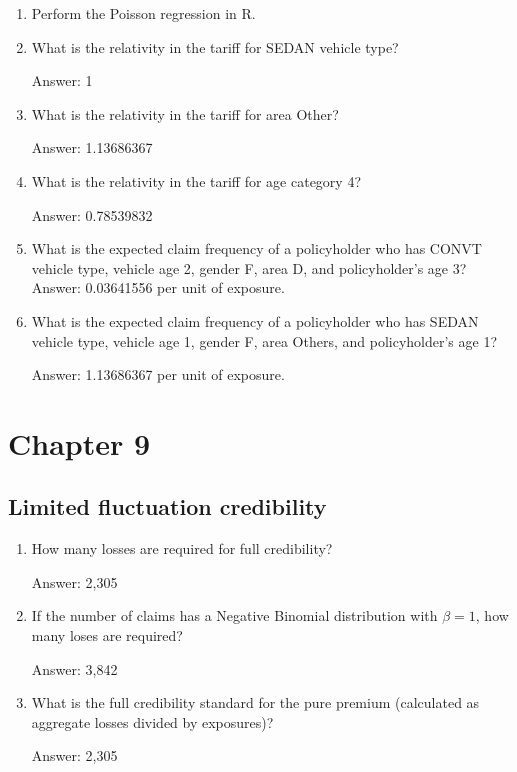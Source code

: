 \documentclass[11pt,a4paper,onecolumn]{article}
\begin{document}
\begin{enumerate}
\begin{enumerate}
	\item Perform the Poisson regression in R.
	\item What is the relativity in the tariff for SEDAN vehicle type?\par
	Answer: 1
	\item What is the relativity in the tariff for area Other?\par
	Answer:  1.13686367
	\item What is the relativity in the tariff for age category 4?\par
	Answer: 0.78539832
	\item What is the expected claim frequency of a policyholder who has CONVT vehicle type, vehicle age 2, gender F, area D, and policyholder's age 3?
	Answer: 0.03641556 per unit of exposure.
	\item What is the expected claim frequency of a policyholder who has SEDAN vehicle type, vehicle age 1, gender F, area Others, and policyholder's age 1?\par
	Answer: 1.13686367 per unit of exposure.
\end{enumerate}
\end{enumerate}

\section{Chapter 9}

\subsection{Limited fluctuation credibility}
\begin{enumerate}
	\item How many losses are required for full credibility?\par
	Answer: 2,305
	\item If the number of claims has a Negative Binomial distribution with $\beta=1$, how many loses are required?\par
	Answer: 3,842
	\item What is the full credibility standard for the pure premium (calculated as aggregate losses divided by exposures)?\par
	Answer: 2,305
\end{enumerate}
\end{document}
